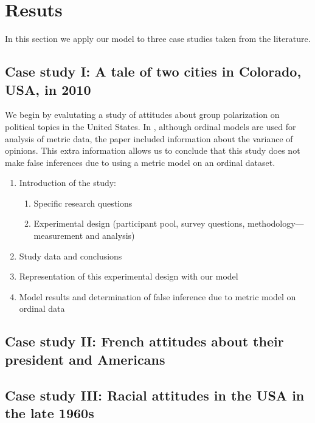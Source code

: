 \documentclass[11pt,letterpaper]{article}
\begin{document}
\section{Resuts}

In this section we apply our model to three case studies taken from the 
literature. 

\subsection{Case study I: A tale of two cities in Colorado, USA, in 2010}

We begin by evalutating a study of attitudes about group 
polarization on political topics
in the United States. In , 
although ordinal models are used for analysis of metric data, the paper 
included information about the variance of opinions. This extra information
allows us to conclude that this study does not make false inferences due to
using a metric model on an ordinal dataset.

\begin{enumerate}
  \item Introduction of the study:
    \begin{enumerate}
      \item Specific research questions 
      \item Experimental design (participant pool, survey questions,
        methodology---measurement and analysis)
    \end{enumerate}
  \item Study data and conclusions 
  \item Representation of this experimental design with our model
  \item Model results and determination of false inference due to 
    metric model on ordinal data
\end{enumerate}

\subsection{Case study II: French attitudes about their president and Americans}



\subsection{Case study III: Racial attitudes in the USA in the late 1960s}
\end{document}
